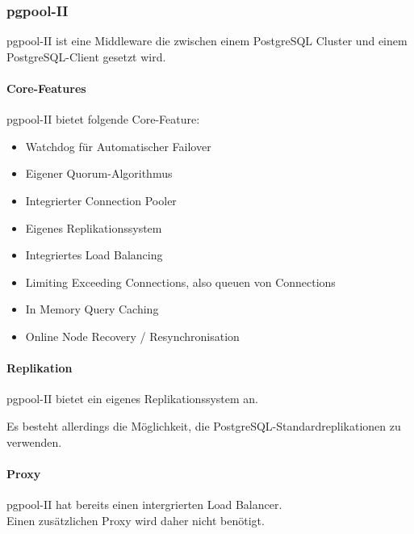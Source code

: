 
\subsubsection{pgpool-II}
\begin{flushleft}
    pgpool-II ist eine Middleware die zwischen einem \Gls{PostgreSQL Cluster} und einem PostgreSQL-Client gesetzt wird.
\end{flushleft}
\begin{flushleft}
    \paragraph{Core-Features}
    pgpool-II bietet folgende Core-Feature\cite{3XWCD3KX}:
    \begin{itemize}
        \item Watchdog für Automatischer Failover
        \item Eigener \Gls{Quorum}-Algorithmus
        \item Integrierter \Gls{Connection Pooler}
        \item Eigenes Replikationssystem
        \item Integriertes Load Balancing
        \item Limiting Exceeding Connections, also queuen von Connections
        \item In Memory Query Caching
        \item Online Node Recovery / Resynchronisation
    \end{itemize}
\end{flushleft}
\begin{flushleft}
    \paragraph{Replikation}
    pgpool-II bietet ein eigenes Replikationssystem an.
\end{flushleft}
\begin{flushleft}
    Es besteht allerdings die Möglichkeit, die PostgreSQL-Standardreplikationen zu verwenden.
\end{flushleft}
\begin{flushleft}
    \paragraph{Proxy}
    pgpool-II hat bereits einen intergrierten Load Balancer.\\
    Einen zusätzlichen Proxy wird daher nicht benötigt.
\end{flushleft}
